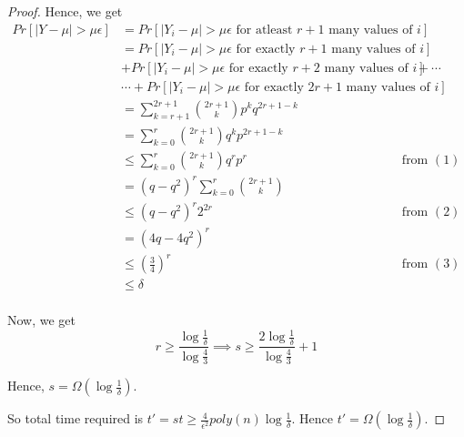 \documentclass[12pt]{article}
\begin{document}
\begin{proof}
Hence, we get
\begin{align*}
    Pr[|Y-\mu| > \mu \epsilon] &= Pr[|Y_i-\mu| > \mu \epsilon \text{ for atleast } r+1 \text{ many values of } i] \\
    &= Pr[|Y_i-\mu| > \mu \epsilon \text{ for exactly } r+1 \text{ many values of } i] \\
    & + Pr[|Y_i-\mu| > \mu \epsilon \text{ for exactly } r+2 \text{ many values of } i] + \cdots \\
    & \cdots + Pr[|Y_i-\mu| > \mu \epsilon \text{ for exactly } 2r+1 \text{ many values of } i] \\
    &= \sum_{k=r+1}^{2r+1} {2r+1 \choose k} p^k q^{2r+1-k} \\
    &= \sum_{k=0}^{r} {2r+1 \choose k} q^k p^{2r+1-k} \\
    &\leq \sum_{k=0}^{r} {2r+1 \choose k} q^r p^r &\text{from }(1)\\
    &= (q-q^2)^r \sum_{k=0}^{r} {2r+1 \choose k} \\
    &\leq (q-q^2)^r 2^{2r} &\text{from }(2)\\
    &= (4q-4q^2)^r  \\
    &\leq \left(\frac{3}{4}\right)^r &\text{from }(3)\\
    &\leq \delta \\
\end{align*}

Now, we get $$r \geq \frac{\log\frac{1}{\delta}}{\log\frac{4}{3}} \implies s \geq \frac{2\log\frac{1}{\delta}}{\log\frac{4}{3}} + 1$$

Hence, $s = \Omega(\log\frac{1}{\delta})$.

So total time required is $t' = st \geq \frac{4}{\epsilon^2}poly(n)\log\frac{1}{\delta}$. Hence $t' = \Omega\left(\log \frac{1}{\delta}\right)$.
\end{proof}
\end{document}
